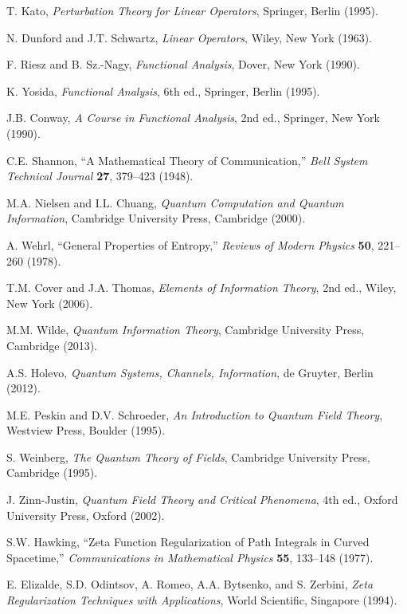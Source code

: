 \documentclass[11pt]{article}
\theoremstyle{plain}
\theoremstyle{definition}
\theoremstyle{remark}
\begin{document}
\begin{thebibliography}{99}
 T. Kato, \emph{Perturbation Theory for Linear Operators}, Springer, Berlin (1995).

 N. Dunford and J.T. Schwartz, \emph{Linear Operators}, Wiley, New York (1963).

 F. Riesz and B. Sz.-Nagy, \emph{Functional Analysis}, Dover, New York (1990).

 K. Yosida, \emph{Functional Analysis}, 6th ed., Springer, Berlin (1995).

 J.B. Conway, \emph{A Course in Functional Analysis}, 2nd ed., Springer, New York (1990).

 C.E. Shannon, ``A Mathematical Theory of Communication,'' \emph{Bell System Technical Journal} \textbf{27}, 379--423 (1948).

 M.A. Nielsen and I.L. Chuang, \emph{Quantum Computation and Quantum Information}, Cambridge University Press, Cambridge (2000).

 A. Wehrl, ``General Properties of Entropy,'' \emph{Reviews of Modern Physics} \textbf{50}, 221--260 (1978).

 T.M. Cover and J.A. Thomas, \emph{Elements of Information Theory}, 2nd ed., Wiley, New York (2006).

 M.M. Wilde, \emph{Quantum Information Theory}, Cambridge University Press, Cambridge (2013).

 A.S. Holevo, \emph{Quantum Systems, Channels, Information}, de Gruyter, Berlin (2012).

 M.E. Peskin and D.V. Schroeder, \emph{An Introduction to Quantum Field Theory}, Westview Press, Boulder (1995).

 S. Weinberg, \emph{The Quantum Theory of Fields}, Cambridge University Press, Cambridge (1995).

 J. Zinn-Justin, \emph{Quantum Field Theory and Critical Phenomena}, 4th ed., Oxford University Press, Oxford (2002).

 S.W. Hawking, ``Zeta Function Regularization of Path Integrals in Curved Spacetime,'' \emph{Communications in Mathematical Physics} \textbf{55}, 133--148 (1977).

 E. Elizalde, S.D. Odintsov, A. Romeo, A.A. Bytsenko, and S. Zerbini, \emph{Zeta Regularization Techniques with Applications}, World Scientific, Singapore (1994).


\end{thebibliography}
\end{document}
